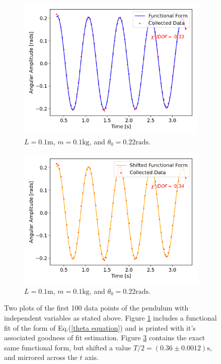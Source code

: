 \begin{figure}[H]
\centering
\begin{subfigure}[t]{0.5\textwidth}
  \centering
  \includegraphics[width=1\textwidth]{Plots/symmetry_plot.png}
    \caption{\small{$L = 0.1\text{m}$, $m = 0.1\text{kg}$, and $\theta_0 = 0.22\text{rads}$.}}
  \label{symmetry}
\end{subfigure}%
\begin{subfigure}[t]{.5\textwidth}
  \centering
  \includegraphics[width=\textwidth]{Plots/symmetry_shifted.png}
    \caption{\small{$L = 0.1\text{m}$, $m = 0.1\text{kg}$, and $\theta_0 = 0.22\text{rads}$.}}
  \label{symmetry_shifted}
\end{subfigure}
\caption{\small{Two plots of the first 100 data points of the pendulum with independent variables as stated above. Figure \ref{symmetry} includes a functional fit of the form of Eq.(\ref{theta equation}) and is printed with it's associated goodness of fit estimation. Figure \ref{symmetry_shifted} contains the exact same functional form, but shifted a value $T/2 = (0.36\pm 0.0012)\text{s}$, and mirrored across the $t$ axis.}}
\end{figure}


